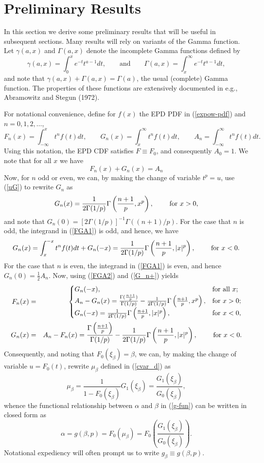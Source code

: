 \documentclass[11pt]{article}
\newcommand{\be}{\begin{equation}}
\newcommand{\ee}{\end{equation}}
\newcommand{\ba}{\begin{eqnarray}}
\newcommand{\ea}{\end{eqnarray}}
\newcommand{\B}{\ensuremath{\xi_{\beta}}}
\newcommand{\nc}{\normalcolor}
\begin{document}
\section{Preliminary Results}\label{sec:prelim}
In this section we  derive some  preliminary results
that will be useful in subsequent sections.  Many results will rely on
variants of the Gamma function. Let $\gamma(a,x)$ and $\Gamma(a,x)$ denote the incomplete Gamma
functions defined by
%
\be\label{uG}
\gamma(a,x) = \int_0^x e^{-t}t^{a-1} dt, \qquad\text{and}\qquad  
\Gamma(a,x) = \int_x^{\infty} e^{-t}t^{a-1} dt,
\ee
%
and note that $\gamma(a,x) + \Gamma(a,x) = \Gamma(a)$, the usual
(complete) Gamma function. The properties of these functions are
extensively documented in e.g., Abramowitz and Stegun (1972).
\nc

For notational convenience, define for $f(x)$ the EPD PDF in
(\ref{expow-pdf}) and $n=0,1,2,\ldots$, 
\be
\label{FGA1} F_n(x) = \int_{-\infty}^x t^n f(t) dt , \qquad 
 G_n(x) = \int_x^{\infty} t^n f(t) dt , \qquad 
 A_n = \int_{-\infty}^{\infty} t^n f(t) dt.
\ee
Using this notation, the EPD CDF satisfies $F \equiv F_0$, and consequently $A_0 = 1$.  We note that for all $x$ we have 
\be \label{FGA2}
F_n(x) + G_n(x) = A_n
\ee
Now, for $n$ odd or even, we can, by making the change of variable $t^p = u$, use (\ref{uG}) to rewrite $G_n$ as
\be \label{G_n+}
G_n(x) = \frac{1}{2\Gamma(1/p)} \Gamma\left(\frac{n+1}{p},x^p\right), \qquad \mbox{\rm{  for  }} x > 0,
\ee
and note that  $G_n(0) = [2\Gamma(1/p)]^{-1}\Gamma((n+1)/p)$.
For the case that $n$ is odd, the integrand in (\ref{FGA1}) is odd, and hence, we have
\be \label{G_n-}
G_n(x) = \int_x^{-x} t^n f(t) dt + G_n(-x) = \frac{1}{2\Gamma(1/p)} \Gamma\left(\frac{n+1}{p},|x|^p\right), \qquad \mbox{\rm{  for  }} x < 0.
\ee
For the case that $n$ is even, the integrand in (\ref{FGA1}) is even,
and hence $G_n(0) = \frac{1}{2}A_n$. Now, using (\ref{FGA2}) and (\ref{G_n+}) yields
\ba
F_n(x) &=& 
\begin{cases}
G_n(-x), & \text{for all $x$}; \\
A_n - G_n(x) = \frac{\Gamma(\frac{n+1}{p})}{\Gamma(1/p)}-
\frac{1}{2\Gamma(1/p)} \Gamma\left(\frac{n+1}{p},x^p\right), & \text{for $x > 0$}; \\
G_n(-x) = \frac{1}{2\Gamma(1/p)}\Gamma\left(\frac{n+1}{p},|x|^p\right), & \text{for $x < 0$}, \\
\end{cases} \label{Fn_function}
\\
G_n(x) &=& A_n - F_n(x) = \frac{\Gamma\left(\frac{n+1}{p}\right)}{\Gamma(1/p)}- \frac{1}{2\Gamma(1/p)} \Gamma\left(\frac{n+1}{p},|x|^p\right), \qquad \mbox{\rm{  for  }} x < 0. 
\ea
Consequently, and noting that $F_0(\B) = \beta$, we can,  by making the change of variable $u = F_0(t)$,  rewrite
$\mu_{\beta}$ defined in (\ref{cvar_d}) as \nc
\be \label{mu_beta}
\mu_{\beta} = \frac{1}{1-F_0(\B)}G_1(\B) = \frac{G_1(\B)}{G_0(\B)},
\ee
whence the functional relationship between $\alpha$ and $\beta$ in
(\ref{g-fun}) can be written in closed form as
\be \label{gb}
\alpha = g(\beta,p)= F_0(\mu_{\beta}) = F_0\left(\frac{G_1(\B)}{G_0(\B)}\right).
\ee
Notational expediency will often prompt us to write $g_{\beta}\equiv g(\beta,p)$. 
\end{document}

